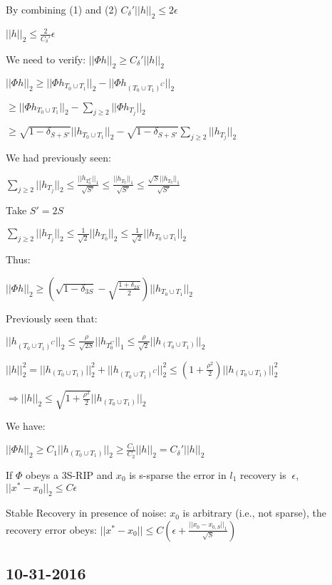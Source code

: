 \documentclass[12pt,letterpaper]{report}
\begin{document}
By combining (1) and (2) $C_\delta' ||h||_2 \leq 2 \epsilon$

$||h||_2 \leq \frac{2}{C_\delta'} \epsilon$

We need to verify: $||\Phi h||_2 \geq C_\delta' ||h||_2$

$||\Phi h||_2 \geq ||\Phi h_{T_0 \cup T_1}||_2 - ||\Phi h_{(T_0 \cup T_1)^C}||_2$

$ \geq ||\Phi h_{T_0 \cup T_1}||_2 - \sum\limits_{j \geq 2} ||\Phi h_{T_j}||_2$

$ \geq \sqrt{1 - \delta_{S + S'}} ||h_{T_0 \cup T_1}||_2 - \sqrt{1 - \delta_{S + S'}}\sum\limits_{j \geq 2} ||h_{T_j}||_2$

We had previously seen:

$\sum\limits_{j \geq 2} ||h_{T_j}||_2 \leq \frac{||h_{T_0^C}||_1}{\sqrt{S'}} \leq \frac{||h_{T_0}||_1}{\sqrt{S'}} \leq \frac{\sqrt{S}||h_{T_0}||_1}{\sqrt{S'}}$

Take $S' = 2S$

$\sum\limits_{j \geq 2} ||h_{T_j}||_2 \leq \frac{1}{\sqrt{2}} ||h_{T_0}||_2 \leq \frac{1}{\sqrt{2}}||h_{T_0 \cup T_1}||_2$

Thus:

$||\Phi h||_2 \geq (\sqrt{1 - \delta_{3S}} - \sqrt{\frac{1 + \delta_{2S}}{2}}) ||h_{T_0 \cup T_1}||_2$

Previously seen that:

$||h_{(T_0 \cup T_1)^C}||_2 \leq \frac{\rho}{\sqrt{2S}}||h_{T_0^C}||_1 \leq \frac{\rho}{\sqrt{2}} ||h_{(T_0 \cup T_1)}||_2$

$||h||_2^2 = ||h_{(T_0 \cup T_1)}||_2^2 + ||h_{(T_0 \cup T_1)^C}||_2^2 \leq (1 + \frac{\rho^2}{2})||h_{(T_0 \cup T_1)}||_2^2$

$\Rightarrow ||h||_2 \leq \sqrt{1 + \frac{\rho^2}{2}}||h_{(T_0 \cup T_1)}||_2$

We have:

$||\Phi h||_2 \geq C_1 ||h_{(T_0 \cup T_1)}||_2 \geq \frac{C_1}{C_2}||h||_2 = C_\delta'||h||_2$

If $\Phi$ obeys a 3S-RIP and $x_0$ is s-sparse the error in $l_1$ recovery is $~\epsilon$, $||x^* - x_0||_2 \leq C \epsilon$

Stable Recovery in presence of noise: $x_0$ is arbitrary (i.e., not sparse), the recovery error obeys: $||x^* - x_0|| \leq C ( \epsilon + \frac{||x_0 - x_{0,S}||_1}{\sqrt{S}})$

\subsection*{10-31-2016}
\end{document}
